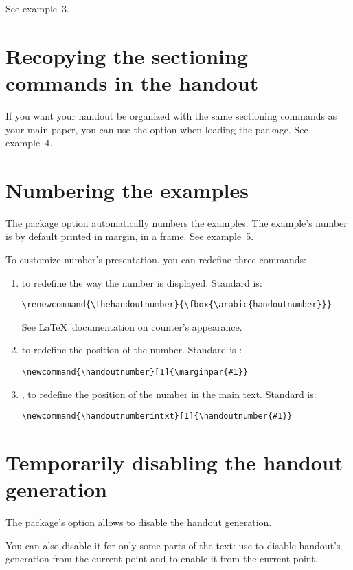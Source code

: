 \documentclass{ltxdockit}[2011/03/25]
\begin{document}
See example~3.

\section{Recopying the sectioning commands in the handout}

If you want your handout be organized with the same sectioning commands as your main paper, you can use the option  when loading the package. See example~4.

\section{Numbering the examples}

The package option  automatically numbers the examples. The example's number is by default printed in margin, in a frame. See example~5. 

To customize number's presentation, you can redefine three commands:
\begin{enumerate}  
  \item {} to redefine the way the number is displayed. Standard is:
\begin{verbatim}
\renewcommand{\thehandoutnumber}{\fbox{\arabic{handoutnumber}}}
\end{verbatim}  
See \LaTeX\ documentation on counter's appearance. 
  \item {} to redefine the position of the number. Standard is :
\begin{verbatim}
\newcommand{\handoutnumber}[1]{\marginpar{#1}}
\end{verbatim}
  \item {}, to redefine the position of the number in the main text. Standard is:
\begin{verbatim}
\newcommand{\handoutnumberintxt}[1]{\handoutnumber{#1}}
\end{verbatim}
\end{enumerate}

\section{Temporarily disabling the handout generation}

The package's option  allows to disable the handout generation. 

\label{enablehandout}You can also disable it for only some parts of the text: use  to disable handout's generation from the current point and  to enable it from the current point.
\end{document}

